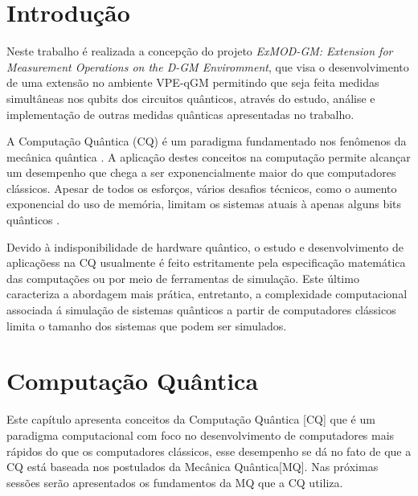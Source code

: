 \documentclass[tcc,capa]{texufpel}
\begin{document}
\tableofcontents

\chapter{Introdução}
Neste trabalho é realizada a concepção do  projeto \emph{ExMOD-GM: Extension for Measurement Operations on the D-GM Enviromment}, que visa o desenvolvimento de uma extensão no ambiente VPE-qGM \cite{maron:2013:ccgrid} permitindo que seja feita medidas simultâneas nos qubits dos circuitos quânticos, através do estudo, análise e implementação de outras medidas quânticas apresentadas no trabalho.

A Computação Quântica (CQ) é um paradigma fundamentado nos fenômenos
da mecânica quântica \cite{chuang00a}. A aplicação destes conceitos na computação permite alcançar um desempenho que  chega a ser exponencialmente maior do que computadores clássicos. Apesar de todos os esforços, vários desafios técnicos, como o aumento exponencial do uso de memória, limitam os sistemas atuais à apenas alguns bits quânticos \cite{steeb2011problems}.

Devido à indisponibilidade de hardware quântico, o estudo e desenvolvimento de aplicaçõess na CQ usualmente é feito estritamente pela especificação matemática das
computações ou por meio de ferramentas de simulação. Este último caracteriza a abordagem mais prática, entretanto, a complexidade computacional associada á simulação de
sistemas quânticos a partir de computadores clássicos limita o tamanho dos sistemas que
podem ser simulados.


\begin{quote}

\end{quote}
  




\chapter{Computação Quântica}



Este capítulo apresenta conceitos da Computação Quântica [CQ] que é um paradigma computacional com foco no desenvolvimento de computadores mais rápidos do que os computadores clássicos, esse desempenho se dá no fato de que a CQ está baseada nos postulados da Mecânica Quântica[MQ]. Nas próximas sessões serão apresentados os fundamentos da MQ que a CQ utiliza.
\end{document}
